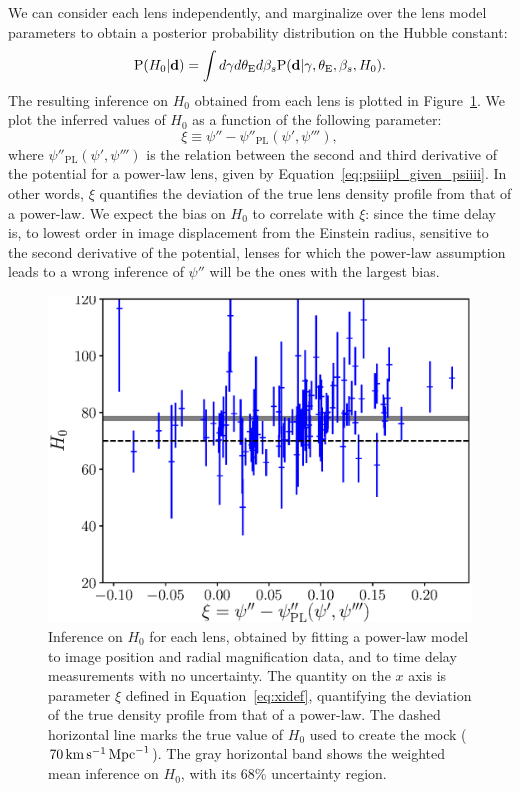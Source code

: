 \documentclass[usenatbib]{mnras}
\def\psii{\psi'}
\def\psiii{\psi''}
\def\psiiii{\psi'''}
\def\tein{\theta_{\mathrm{E}}}
\def\data{\mathbf{d}}
\def\Fref#1{Figure~\ref{#1}\xspace}
\def\Eref#1{Equation~\ref{#1}\xspace}
\def\pr{{\rm P}}
\begin{document}
We can consider each lens independently, and marginalize over the lens model parameters to obtain a posterior probability distribution on the Hubble constant:
\begin{equation}
\pr(H_0 | \data) = \int d\gamma d\tein d\beta_s \pr(\data | \gamma, \tein, \beta_s, H_0).
\end{equation}
The resulting inference on $H_0$ obtained from each lens is plotted in \Fref{fig:plH0}.
We plot the inferred values of $H_0$ as a function of the following parameter:
\begin{equation}\label{eq:xidef}
\xi \equiv \psiii - \psi''_{\mathrm{PL}}(\psii, \psiiii),
\end{equation}
where $\psi''_{\mathrm{PL}}(\psii, \psiiii)$ is the relation between the second and third derivative of the potential for a power-law lens, given by \Eref{eq:psiiipl_given_psiiii}.
In other words, $\xi$ quantifies the deviation of the true lens density profile from that of a power-law.
We expect the bias on $H_0$ to correlate with $\xi$: since the time delay is, to lowest order in image displacement from the Einstein radius, sensitive to the second derivative of the potential, lenses for which the power-law assumption leads to a wrong inference of $\psiii$ will be the ones with the largest bias.
%
%
\begin{figure}
 \includegraphics[width=\columnwidth]{individual_H0.eps}
 \caption{Inference on $H_0$ for each lens, obtained by fitting a power-law model to image position and radial magnification data, and to time delay measurements with no uncertainty.
The quantity on the $x$ axis is parameter $\xi$ defined in \Eref{eq:xidef}, quantifying the deviation of the true density profile from that of a power-law.
The dashed horizontal line marks the true value of $H_0$ used to create the mock ($70\,\rm{km}\,\rm{s}^{-1}\,\rm{Mpc}^{-1}$).
The gray horizontal band shows the weighted mean inference on $H_0$, with its 68\% uncertainty region.
}
 \label{fig:plH0}
\end{figure}
\end{document}
